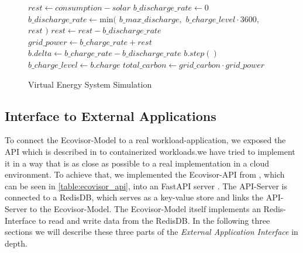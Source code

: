 \begin{figure}
    \removelatexerror
    \begin{algorithm}[H]
        \caption{Virtual Energy System Simulation}
        \label{alg:virtual_energy_system_simulation}
        $rest \gets consumption - solar$\;
         {
            $b\_discharge\_rate \gets 0$\;
        }{
            $b\_discharge\_rate \gets \text{min}($\;
            \Indp
                $b\_max\_discharge,$\;
                $b\_charge\_level \cdot 3600,$\;
                $rest$\;
            \Indm
            $)$\;
            $rest \gets rest - b\_discharge\_rate$\;
        }
        $grid\_power \gets b\_charge\_rate + rest$\;
        $b.delta \gets b\_charge\_rate - b\_discharge\_rate$\;
        $b.step()$\;
        $b\_charge\_level \gets b.charge$\;
        $total\_carbon \gets grid\_carbon \cdot grid\_power$\;
        \vspace{3mm}
    \end{algorithm}
\end{figure}

\subsection{Interface to External Applications}

To connect the Ecovisor-Model to a real workload-application, we exposed the API which is described in \cite{souza2023} to containerized workloads.we have tried to implement it in a way that is as close as possible to a real implementation in a cloud environment.
To achieve that, we implemented the Ecovisor-API from \cite{souza2023}, which can be seen in \ref{table:ecovisor_api}, into an FastAPI server \cite{fastapi}.
The API-Server is connected to a RedisDB\cite{redis}, which serves as a key-value store and links the API-Server to the Ecovisor-Model. 
The Ecovisor-Model itself implements an Redis-Interface to read and write data from the RedisDB.
In the following three sections we will describe these three parts of the \textit{External Application Interface} in depth.

